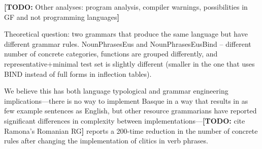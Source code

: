 \documentclass[11pt]{article}
\newcommand{\todo}[1]{{\color{cyan}\textbf{[TODO: }#1\textbf{]}}}
\begin{document}
\todo{Other analyses: program analysis, compiler warnings,
  possibilities in GF and not programming languages}

Theoretical question: two grammars that produce the same language but
have different grammar rules.
NounPhrasesEus and NounPhrasesEusBind -- different number of concrete
categories, functions are grouped differently, and
representative+minimal test set is slightly different (smaller in the
one that uses BIND instead of full forms in inflection tables).

We believe this has both language typological and grammar engineering
implications---there is no way to implement Basque in a way that
results in as few example sentences as English, but other resource
grammarians have reported significant differences in complexity
between implementations---\todo{cite Ramona's Romanian RG} reports a
200-time reduction in the number of concrete rules after changing the
implementation of clitics in verb phrases.






\end{document}
